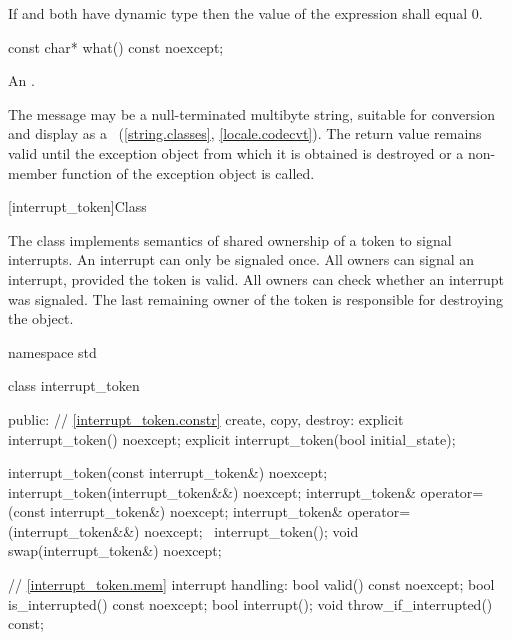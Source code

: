 {\begin{itemdescr}
  \pnum \postconditions If  and  both have dynamic type 
        then the value of the expression  shall equal 0.
\end{itemdescr}

%
\begin{itemdecl}
const char* what() const noexcept;
\end{itemdecl}

\begin{itemdescr}
\pnum
\returns
An  \ntbs{}.

\pnum
\remarks
The message may be a null-terminated multibyte string,
suitable for conversion and display as a
~(\ref{string.classes}, \ref{locale.codecvt}).
The return value remains valid until the exception object from which
it is obtained is destroyed or a non-
member function of the exception object is called.
\end{itemdescr}


%
[interrupt_token]{Class }

\pnum
{}%
The class  implements semantics of shared ownership of a 
token to signal interrupts.
An interrupt can only be signaled once.
All owners can signal an interrupt, provided the token is valid.
All owners can check whether an interrupt was signaled.
The last remaining owner of the token is responsible for destroying
the object.

\begin{codeblock}
namespace std {
  class interrupt_token {
  public:
    // \ref{interrupt_token.constr} create, copy, destroy:
    explicit interrupt_token() noexcept;
    explicit interrupt_token(bool initial_state);

    interrupt_token(const interrupt_token&) noexcept;
    interrupt_token(interrupt_token&&) noexcept;
    interrupt_token& operator=(const interrupt_token&) noexcept;
    interrupt_token& operator=(interrupt_token&&) noexcept;
    ~interrupt_token();
    void swap(interrupt_token&) noexcept;

    // \ref{interrupt_token.mem} interrupt handling:
    bool valid() const noexcept;
    bool is_interrupted() const noexcept;
    bool interrupt();
    void throw_if_interrupted() const;
  }
}


\end{codeblock}}
